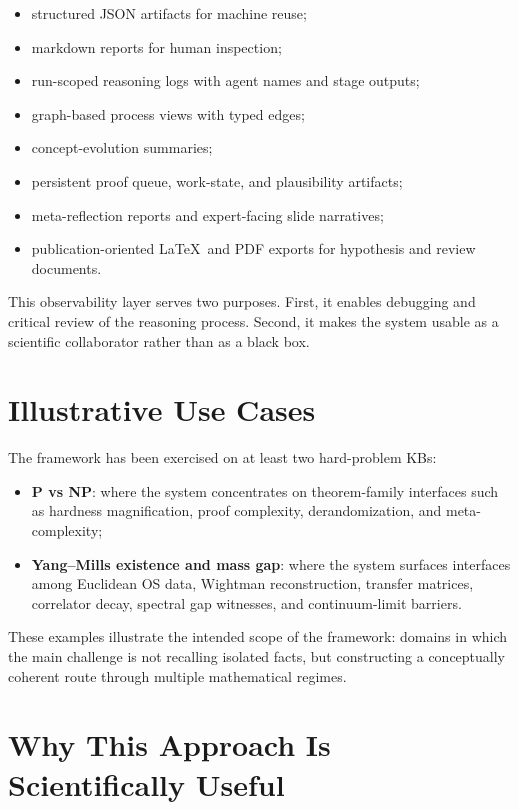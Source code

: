 \documentclass[11pt]{article}
\begin{document}
\begin{itemize}[leftmargin=*,itemsep=0.2em]
\item structured JSON artifacts for machine reuse;
\item markdown reports for human inspection;
\item run-scoped reasoning logs with agent names and stage outputs;
\item graph-based process views with typed edges;
\item concept-evolution summaries;
\item persistent proof queue, work-state, and plausibility artifacts;
\item meta-reflection reports and expert-facing slide narratives;
\item publication-oriented \LaTeX\ and PDF exports for hypothesis and review documents.
\end{itemize}

This observability layer serves two purposes. First, it enables debugging and critical review of the reasoning process. Second, it makes the system usable as a scientific collaborator rather than as a black box.

\section{Illustrative Use Cases}

The framework has been exercised on at least two hard-problem KBs:

\begin{itemize}[leftmargin=*,itemsep=0.2em]
\item \textbf{P vs NP}: where the system concentrates on theorem-family interfaces such as hardness magnification, proof complexity, derandomization, and meta-complexity;
\item \textbf{Yang--Mills existence and mass gap}: where the system surfaces interfaces among Euclidean OS data, Wightman reconstruction, transfer matrices, correlator decay, spectral gap witnesses, and continuum-limit barriers.
\end{itemize}

These examples illustrate the intended scope of the framework: domains in which the main challenge is not recalling isolated facts, but constructing a conceptually coherent route through multiple mathematical regimes.

\section{Why This Approach Is Scientifically Useful}
\end{document}
